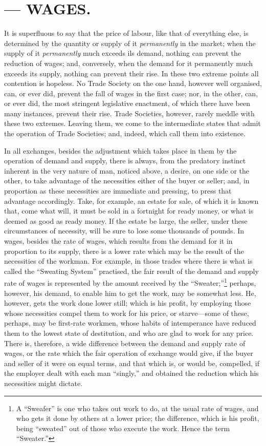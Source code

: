 \chapter{--- WAGES.} \label{WAGES}

It is superfluous to say that the price of labour, like that of
everything else, is determined by the quantity or supply of it
\textit{permanently} in the market; when the supply of it
\textit{permanently} much exceeds ils demand, nothing can prevent the
reduction of wages; and, conversely, when the demand for it permanently
much exceeds its supply, nothing can prevent their rise. In these two
extreme points all contention is hopeless. No Trade Society on the one
hand, however well organised, can, or ever did, prevent the fall of
wages in the first case; nor, in the other, can, or ever did, the most
stringent legislative enactment, of which there have been many
instances, prevent their rise. Trade Societies, however, rarely meddle
with these two extremes. Leaving them, we come to the intermediate
states that admit the operation of Trade Societies; and, indeed, which
call them into existence.

In all exchanges, besides the adjustment which takes place in them by
the operation of demand and supply, there is always, from the predatory
instinct inherent in the very nature of man, noticed above, a desire, on
one side or the other, to take advantage of the necessities either of
the buyer or seller; and, in proportion as these necessities are
immediate and pressing, to press that advantage accordingly. Take, for
example, an estate for sale, of which it is known that, come what will,
it must be sold in a fortnight for ready money, or what is deemed as
good as ready money. If the estate be large, the seller, under these
circumstances of necessity, will be sure to lose some thousands of
pounds. In wages, besides the rate of wages, which results from the
demand for it in proportion to its supply, there is a lower rate which
may be the result of the necessities of the workman. For example, in
those trades where there is what is called the ``Sweating System''
practised, the fair result of the demand and supply rate of wages is
represented by the amount received by the ``Sweater;''\footnote{A
``Sweafer'' is one who takes out work to do, at the usual rate of wages,
and who gets it done by others at a lower price; the difference, which
is his profit, being ``sweated'' out of those who execute the work.
Hence the term ``Sweater.''} perhaps, however, his demand, to enable him
to get the work, may be somewhat less. He, however, gets the work done
lower still; which is his profit, by employing those whose necessities
compel them to work for his price, or starve---some of these, perhaps,
may be first-rate workmen, whose habits of intemperance have reduced
them to the lowest state of destitution, and who are glad to work for
any price. There is, therefore, a wide difference between the demand and
supply rate of wages, or the rate which the fair operation of exchange
would give, if the buyer and seller of it were on equal terms, and that
which is, or would be, compelled, if the employer dealt with each man
``singly,'' and obtained the reduction which his necessities might
dictate.

